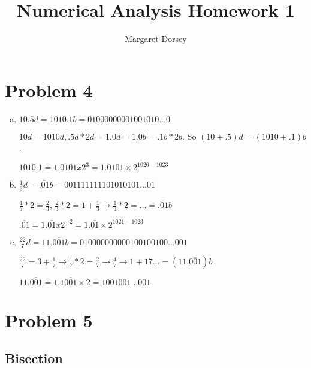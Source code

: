 \documentclass[11pt]{article} %
\title{Numerical Analysis Homework 1}
\author{Margaret Dorsey}
\begin{document}
\maketitle

\section*{Problem 4}
\begin{enumerate}[a.)]
\item $10.5d = 1010.1b = 01000000001001010\ldots0$
\par $10d = 1010d, .5d * 2d = 1.0d = 1.0b = .1b * 2b$. So $(10+.5)d = (1010 + .1)b$.
\par $1010.1 = 1.0101 x 2^3 = 1.0101 \times 2^{1026 - 1023}$
\item $\frac{1}{3}d = \overline{.01}b = 001111111101010101\ldots01$
\par $\frac{1}{3} * 2 = \frac{2}{3}$, $\frac{2}{3} * 2 = 1 + \frac{1}{3} \rightarrow \frac{1}{3} * 2 = \ldots = \overline{.01}b$
\par $\overline{.01} = 1.\overline{01} x 2^{-2} = 1.\overline{01} \times 2^{1021 - 1023}$
\item $\frac{22}{7}d = 11.\overline{001}b = 010000000000100100100\ldots001$
\par $\frac{22}{7} = 3 + \frac{1}{7} \rightarrow \frac{1}{7} * 2 = \frac{2}{7} \rightarrow \frac{4}{7} \rightarrow 1 + {1}{7} \ldots = (11.\overline{001})b$
\par $11.\overline{001} = 1.1\overline{001} \times 2 = 1001001 \ldots 001$
\end{enumerate}

\section*{Problem 5}

\subsection*{Bisection}
\end{document}
